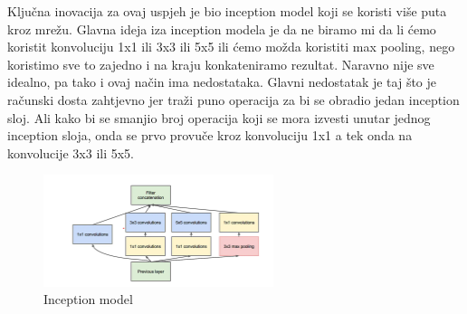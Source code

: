 Ključna inovacija za ovaj uspjeh je bio inception model koji se koristi više puta kroz mrežu.
Glavna ideja iza inception modela je da ne biramo mi da li ćemo koristit konvoluciju 1x1 ili 3x3 ili 5x5 ili ćemo možda koristiti max pooling, nego koristimo sve to zajedno i na kraju konkateniramo rezultat.
Naravno nije sve idealno, pa tako i ovaj način ima nedostataka.
Glavni nedostatak je taj što je računski dosta zahtjevno jer traži puno operacija za bi se obradio jedan inception sloj.
Ali kako bi se smanjio broj operacija koji se mora izvesti unutar jednog inception sloja, onda se prvo provuče kroz konvoluciju 1x1 a tek onda na konvolucije 3x3 ili 5x5.

\FloatBarrier
\begin{figure}[h]
    \centering
    \includegraphics[width=0.6\textwidth]{images/Inception}
    \caption{Inception model}
    \label{fig:slika12}
\end{figure}
\FloatBarrier